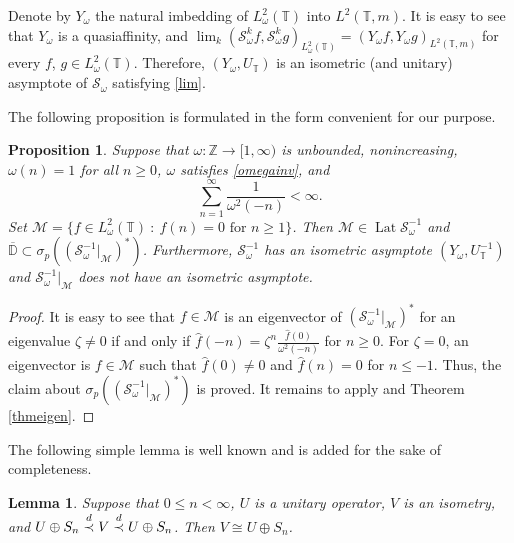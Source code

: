 \documentclass[a4paper,oneside,11pt]{amsart}
\numberwithin{equation}{section}
\theoremstyle{plain}
\newtheorem{lemma}[theorem]{Lemma}
\newtheorem{proposition}[theorem]{Proposition}
\theoremstyle{definition}
\begin{document}
Denote by $Y_\omega$ the natural imbedding of $L^2_\omega(\mathbb T)$ into $L^2(\mathbb T,m)$. 
 It is easy to see that  $Y_\omega$
is a quasiaffinity, and   
$\lim_k(\mathcal S_\omega^kf,\mathcal S_\omega^kg)_{L^2_\omega(\mathbb T)}
=(Y_\omega f, Y_\omega g)_{ L^2(\mathbb T,m)}$ for every $f$, $g\in L^2_\omega(\mathbb T)$. Therefore,   
   $(Y_\omega, U_{\mathbb T})$ is an isometric (and unitary) asymptote of $\mathcal S_\omega$ satisfying \eqref{lim}. 



The following proposition is {\cite[Theorem 3.11(2)]{nik}} formulated in the form convenient for our purpose. 

\begin{proposition}\cite{nik}\label{thmweight}
 Suppose that $\omega\colon\mathbb Z \to [1,\infty)$ is unbounded,   nonincreasing,  $\omega(n)=1$ for all $n\geq 0$,  
$\omega$ satisfies \eqref{omegainv}, and $$\sum_{n=1}^\infty\frac{1}{\omega^2(-n)}<\infty.$$ 
 Set $\mathcal M=\{f\in L^2_\omega(\mathbb T)\ :\ \widehat f(n)=0 \text{ for } n\geq 1\}$.
Then $\mathcal M\in\operatorname{Lat}\mathcal S_\omega^{-1}$ and
 $\overline{\mathbb D}\subset\sigma_p((\mathcal S_\omega^{-1}|_{\mathcal M})^*)$.
Furthermore, $\mathcal S_\omega^{-1}$ has an isometric asymptote $(Y_\omega, U_{\mathbb T}^{-1})$ and $\mathcal S_\omega^{-1}|_{\mathcal M}$ does not have an  isometric asymptote. 
\end{proposition}

\begin{proof} It is easy to see  that $f\in\mathcal M$ is an eigenvector of $(\mathcal S_\omega^{-1}|_{\mathcal M})^*$ for an eigenvalue 
$\zeta\neq 0$ if and only if 
$\widehat f(-n)=\zeta^n \frac{\widehat f(0)}{\omega^2(-n)}$ for $n\geq 0$. For $\zeta=0$, an eigenvector is $f\in\mathcal M$ such that $\widehat f(0)\neq 0$ and $\widehat f(n)=0$ for $n\leq -1$. Thus, the claim about 
$\sigma_p((\mathcal S_\omega^{-1}|_{\mathcal M})^*)$ is proved. It remains to apply  
   {\cite[Proposition 22(a)]{kerntuple}} and Theorem \ref{thmeigen}. 
\end{proof}


The following simple lemma is well known and is added for the sake of completeness. 

\begin{lemma}\label{lemd} Suppose that $0\leq n<\infty$, $U$ is a unitary operator, $V$ is an isometry, and 
$U\oplus S_n\buildrel d \over\prec   V\buildrel d \over\prec  U\oplus S_n$. 
Then $V\cong U\oplus S_n$. 
\end{lemma}
\end{document}
